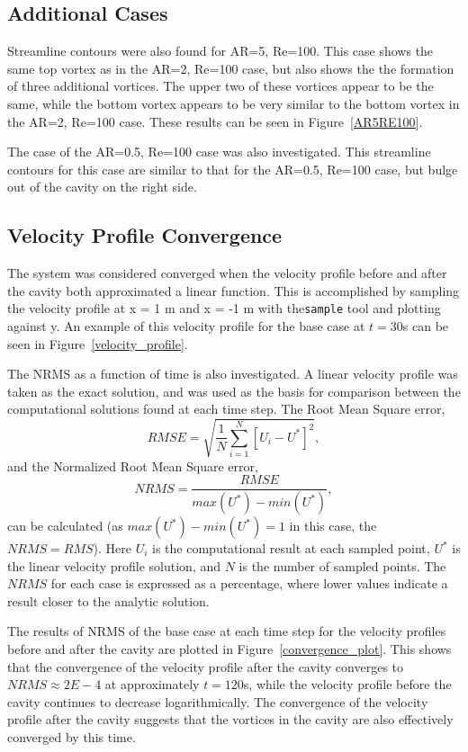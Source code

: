 \documentclass[twocolumn,10pt]{asme2ej}
\begin{document}
\subsection{Additional Cases}
Streamline contours were also found for AR=5, Re=100. This case shows the same top vortex as in the AR=2, Re=100 case, but also shows the the formation of three additional vortices. The upper two of these vortices appear to be the same, while the bottom vortex appears to be very similar to the bottom vortex in the AR=2, Re=100 case. These results can be seen in Figure~\ref{AR5RE100}.

The case of the AR=0.5, Re=100 case was also investigated. This streamline contours for this case are similar to that for the AR=0.5, Re=100 case, but bulge out of the cavity on the right side.

\subsection{Velocity Profile Convergence}
The system was considered converged when the velocity profile before and after the cavity both approximated a linear function. This is accomplished by sampling the velocity profile at x = 1 m and x = -1 m with the\lstinline{sample} tool and plotting against y. An example of this velocity profile for the base case at $t=30$s can be seen in Figure~\ref{velocity_profile}.

The NRMS as a function of time is also investigated. A linear velocity profile was taken as the exact solution, and was used as the basis for comparison between the computational solutions found at each time step. The Root Mean Square error,
\begin{equation}
RMSE = \sqrt{\frac{1}{N}\sum\limits_{i=1}^N[U_i - U^*]^2},
\end{equation}
and the Normalized Root Mean Square error,
\begin{equation}
NRMS = \dfrac{RMSE}{max(U^*)-min(U^*)},
\end{equation}
can be calculated (as $max(U^*)-min(U^*) = 1$ in this case, the $NRMS = RMS$). Here $U_i$ is the computational result at each sampled point, $U^*$ is the linear velocity profile solution, and $N$ is the number of sampled points. The $NRMS$ for each case is expressed as a percentage, where lower values indicate a result closer to the analytic solution.

The results of NRMS of the base case at each time step for the velocity profiles before and after the cavity are plotted in Figure~\ref{convergence_plot}. This shows that the convergence of the velocity profile after the cavity converges to $NRMS \approx 2E-4$ at approximately $t=120$s, while the velocity profile before the cavity continues to decrease logarithmically. The convergence of the velocity profile after the cavity suggests that the vortices in the cavity are also effectively converged by this time.
\end{document}
